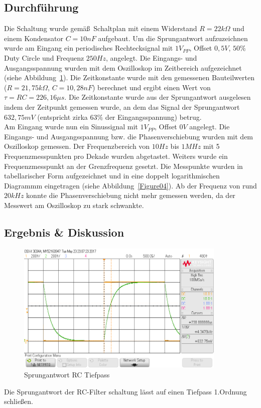 \documentclass[12pt,a4paper,titlepage]{article}
\begin{document}
\subsection{Durchf\"uhrung}
Die Schaltung wurde gem\"a\ss\, Schaltplan mit einem Widerstand $R=22k\Omega$ und einem Kondensator $C=10nF$ aufgebaut. Um die Sprungantwort aufzuzeichnen wurde am Eingang ein periodisches Rechtecksignal mit $1 V_{PP}$, Offset $0,5 V$, $50 \%$ Duty Circle und Frequenz $250 Hz$, angelegt. Die Eingangs- und Ausgangsspannung wurden mit dem Oszilloskop im Zeitbereich aufgezeichnet (siehe Abbildung~\ref{Figure02}). Die Zeitkonstante wurde mit den gemessenen Bauteilwerten ($R=21,75 k\Omega$, $C=10,28nF$) berechnet und ergibt einen Wert von $\tau = RC = 226,16 \mu s$. Die Zeitkonstante wurde aus der Sprungantwort ausgelesen indem der Zeitpunkt gemessen wurde, an dem das Signal der Sprungantwort $632,75 mV$ (entspricht zirka $63 \%$ der Eingangsspannung) betrug. \\
Am Eingang wurde nun ein Sinussignal mit $1 V_{PP}$, Offset $0 V$ angelegt. Die Eingangs- und Ausgangsspannung bzw. die Phasenverschiebung wurden mit dem Oszilloskop gemessen. Der Frequenzbereich von $10Hz$ bis $1MHz$ mit 5 Frequenzmesspunkten pro Dekade wurden abgetastet. Weiters wurde ein Frequenzmesspunkt an der Grenzfrequenz gesetzt. Die Messpunkte wurden in tabellarischer Form aufgezeichnet und in eine doppelt logarithmischen Diagrammm eingetragen (siehe Abbildung~\ref{Figure04}). Ab der Frequenz von rund $20kHz$ konnte die Phasenverschiebung nicht mehr gemessen werden, da der Messwert am Oszilloskop zu stark schwankte.

\subsection{Ergebnis \& Diskussion}
\begin{figure}[H]
  \centering
  \includegraphics[width=100mm]{rc_tiefpassfilter_sprungantwort.png}
  \caption{Sprungantwort RC Tiefpass}
  \label{Figure02}
\end{figure}
\noindent Die Sprungantwort der RC-Filter schaltung l\"asst auf einen Tiefpass 1.Ordnung schlie\ss en.
\end{document}
